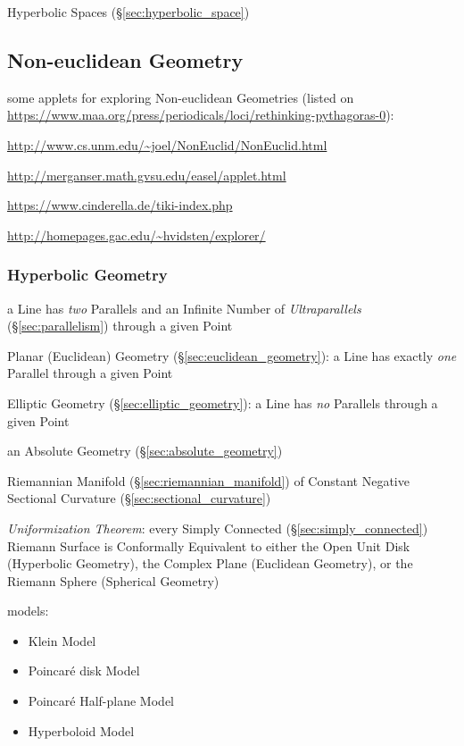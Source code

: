 Hyperbolic Spaces (\S\ref{sec:hyperbolic_space})



\subsection{Non-euclidean Geometry}\label{sec:noneuclidean_geometry}

some applets for exploring Non-euclidean Geometries (listed on
\url{https://www.maa.org/press/periodicals/loci/rethinking-pythagoras-0}):

\url{http://www.cs.unm.edu/~joel/NonEuclid/NonEuclid.html}

\url{http://merganser.math.gvsu.edu/easel/applet.html}

\url{https://www.cinderella.de/tiki-index.php}

\url{http://homepages.gac.edu/~hvidsten/explorer/}



\subsubsection{Hyperbolic Geometry}\label{sec:hyperbolic_geometry}

a Line has \emph{two} Parallels and an Infinite Number of \emph{Ultraparallels}
(\S\ref{sec:parallelism}) through a given Point

\fist Planar (Euclidean) Geometry (\S\ref{sec:euclidean_geometry}): a Line has
  exactly \emph{one} Parallel through a given Point

\fist Elliptic Geometry (\S\ref{sec:elliptic_geometry}): a Line has \emph{no}
  Parallels through a given Point

an Absolute Geometry (\S\ref{sec:absolute_geometry})


Riemannian Manifold (\S\ref{sec:riemannian_manifold}) of Constant Negative
Sectional Curvature (\S\ref{sec:sectional_curvature})

\emph{Uniformization Theorem}: every Simply Connected
(\S\ref{sec:simply_connected}) Riemann Surface is Conformally Equivalent to
either the Open Unit Disk (Hyperbolic Geometry), the Complex Plane (Euclidean
Geometry), or the Riemann Sphere (Spherical Geometry)

models:
\begin{itemize}
  \item Klein Model
  \item Poincar\'e disk Model
  \item Poincar\'e Half-plane Model
  \item Hyperboloid Model
\end{itemize}



